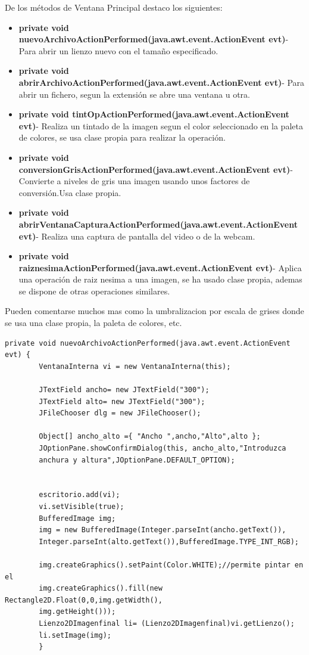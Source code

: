 De los métodos de Ventana Principal destaco los siguientes:
\begin{itemize}
\item \textbf{ private void nuevoArchivoActionPerformed(java.awt.event.ActionEvent evt)}- Para abrir un lienzo nuevo con el tamaño especificado.
\item  \textbf{private void abrirArchivoActionPerformed(java.awt.event.ActionEvent evt)}- Para abrir un fichero, segun la extensión se abre una ventana u otra.
\item \textbf{private void tintOpActionPerformed(java.awt.event.ActionEvent evt)}- Realiza un tintado de la imagen segun el color seleccionado en la paleta de colores, se usa clase propia para realizar la operación.
\item \textbf{private void conversionGrisActionPerformed(java.awt.event.ActionEvent evt)}-Convierte a niveles de gris una imagen usando unos factores de conversión.Usa clase propia.
\item \textbf{private void abrirVentanaCapturaActionPerformed(java.awt.event.ActionEvent evt)}- Realiza una captura de pantalla del video o de la webcam.
\item \textbf{private void raiznesimaActionPerformed(java.awt.event.ActionEvent evt)}- Aplica una operación de raiz nesima a una imagen, se ha usado clase propia, ademas se dispone de otras operaciones similares.
\end{itemize} 
Pueden comentarse muchos mas como la umbralizacion por escala de grises donde se usa una clase propia, la paleta de colores, etc.
\begin{lstlisting}
private void nuevoArchivoActionPerformed(java.awt.event.ActionEvent evt) {
        VentanaInterna vi = new VentanaInterna(this);
        
        JTextField ancho= new JTextField("300");
        JTextField alto= new JTextField("300");
        JFileChooser dlg = new JFileChooser();        

        Object[] ancho_alto ={ "Ancho ",ancho,"Alto",alto };
        JOptionPane.showConfirmDialog(this, ancho_alto,"Introduzca 
        anchura y altura",JOptionPane.DEFAULT_OPTION);
                       
        
        escritorio.add(vi);
        vi.setVisible(true);
        BufferedImage img;
        img = new BufferedImage(Integer.parseInt(ancho.getText()),
        Integer.parseInt(alto.getText()),BufferedImage.TYPE_INT_RGB);

        img.createGraphics().setPaint(Color.WHITE);//permite pintar en el
        img.createGraphics().fill(new Rectangle2D.Float(0,0,img.getWidth(),
        img.getHeight()));
        Lienzo2DImagenfinal li= (Lienzo2DImagenfinal)vi.getLienzo();
        li.setImage(img);
        }
\end{lstlisting}    
